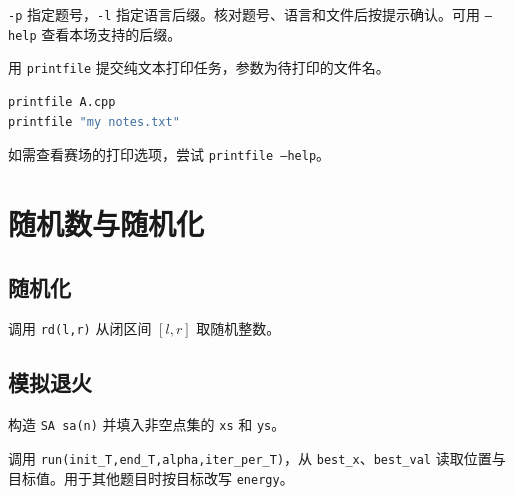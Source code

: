 \texttt{-p} 指定题号，\texttt{-l} 指定语言后缀。核对题号、语言和文件后按提示确认。可用 \texttt{--help} 查看本场支持的后缀。

用 \texttt{printfile} 提交纯文本打印任务，参数为待打印的文件名。

\begin{lstlisting}[language=bash,numbers=none]
printfile A.cpp
printfile "my notes.txt"
\end{lstlisting}

如需查看赛场的打印选项，尝试 \texttt{printfile --help}。

\section{随机数与随机化}

\subsection{随机化}

调用 \texttt{rd(l,r)} 从闭区间 $[l,r]$ 取随机整数。


\subsection{模拟退火}

构造 \texttt{SA sa(n)} 并填入非空点集的 \texttt{xs} 和 \texttt{ys}。

调用 \texttt{run(init\_T,end\_T,alpha,iter\_per\_T)}，从 \texttt{best\_x}、\texttt{best\_val} 读取位置与目标值。用于其他题目时按目标改写 \texttt{energy}。

